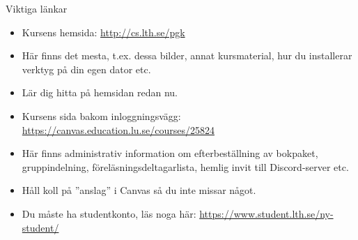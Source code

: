 \begin{SlideExtra}{Viktiga länkar}
  \begin{itemize}
    \item Kursens  hemsida: \url{http://cs.lth.se/pgk}
    \item[] Här finns det mesta, t.ex. dessa bilder, annat kursmaterial, hur du installerar verktyg på din egen dator etc.
    \item[] Lär dig hitta på hemsidan redan nu.
    \item Kursens  sida bakom inloggningsvägg: \url{https://canvas.education.lu.se/courses/25824}
    \item[] Här finns administrativ information om efterbeställning av bokpaket, gruppindelning, föreläsningsdeltagarlista, hemlig invit till Discord-server etc. 
    \item[] Håll koll på ''anslag'' i Canvas så du inte missar något.  
    \item[] Du måste ha studentkonto, läs noga här: \url{https://www.student.lth.se/ny-student/} 
  \end{itemize}
\end{SlideExtra}

\fi


